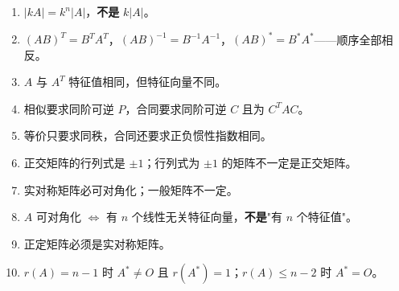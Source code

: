 \documentclass[11pt,openany,UTF8]{ctexbook}
\begin{document}
\begin{enumerate}
\item $\lvert kA\rvert=k^n\lvert A\rvert$，\textbf{不是} $k\lvert A\rvert$。
\item $(AB)^T=B^TA^T$，$(AB)^{-1}=B^{-1}A^{-1}$，$(AB)^*=B^*A^*$——顺序全部相反。
\item $A$ 与 $A^T$ 特征值相同，但特征向量不同。
\item 相似要求同阶可逆 $P$，合同要求同阶可逆 $C$ 且为 $C^TAC$。
\item 等价只要求同秩，合同还要求正负惯性指数相同。
\item 正交矩阵的行列式是 $\pm1$；行列式为 $\pm1$ 的矩阵不一定是正交矩阵。
\item 实对称矩阵必可对角化；一般矩阵不一定。
\item $A$ 可对角化 $\iff$ 有 $n$ 个线性无关特征向量，\textbf{不是}"有 $n$ 个特征值"。
\item 正定矩阵必须是实对称矩阵。
\item $r(A)=n-1$ 时 $A^*\ne O$ 且 $r(A^*)=1$；$r(A)\le n-2$ 时 $A^*=O$。
\end{enumerate}
\end{document}
